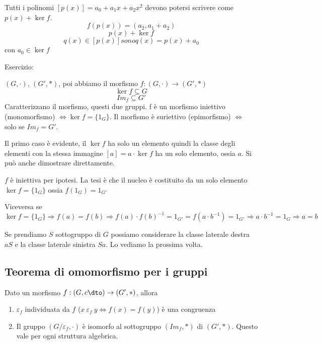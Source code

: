 Tutti i polinomi $[p(x)] = a_0 + a_1 x + a_2 x^2$ devono potersi scrivere come $p(x) + \ker f$.
\[
f(p(x)) = (a_2, a_1 + a_2)
\]
\[
p(x) + \ker f
\]
\[
q(x) \in [p(x)] sono q(x) = p(x) + a_0
\]
con $a_0 \in \ker f$

Esercizio:

$(G, \cdot)$, $(G', \ast)$, poi abbiamo il morfismo $f : (G, \cdot) \to (G', \ast)$
\[
\ker f \subseteq G
\]
\[
Im_f \subseteq G'
\]
Caratterizzano il morfismo, questi due gruppi. f \`e un morfismo iniettivo (monomorfismo) $\Leftrightarrow \ker f = \{ 1_G\}$. Il morfismo \`e suriettivo (epimorfismo) $\Leftrightarrow$ solo se $Im_f = G'$.

Il primo caso \`e evidente, il $\ker f$ ha solo un elemento quindi la classe degli elementi con la stessa immagine $[a] = a \cdot \ker f$ ha un solo elemento, ossia $a$. Si pu\`o anche dimostrare direttamente.

$f$ \`e iniettiva per ipotesi. La tesi \`e che il nucleo \`e costituito da un solo elemento $\ker f = \{ 1_G \} $ ossia $f(1_G) = 1_{G'}$

Viceversa se $\ker f = \{ 1_G \} \Rightarrow f(a) = f(b) \Rightarrow f(a) \cdot f(b)^{-1} = 1_{G'} = f(a \cdot b^{-1}) = 1_{G'} \Rightarrow a \cdot b^{-1} = 1_G \Rightarrow a = b$

Se prendiamo $S$ sottogruppo di $G$ possiamo considerare la classe laterale destra $a S$ e la classe laterale sinistra $S a$. Lo vediamo la prossima volta. 

\subsection{Teorema di omomorfismo per i gruppi}

Dato un morfismo $f : (G, c\dto) \to (G', \ast)$, allora 
\begin{enumerate}
    \item $\varepsilon_f$ individuata da $f$ ($x \ \varepsilon_f \ y \Leftrightarrow f(x) = f(y)$) \`e una congruenza
    \item Il gruppo $(G / \varepsilon_f, \cdot)$ \`e isomorfo al sottogruppo $(Im_f, \ast)$ di $(G', \ast)$. Questo vale per ogni struttura algebrica.
\end{enumerate}

